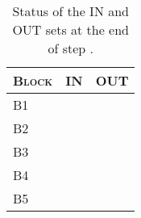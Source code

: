 \begin{table}[H]
\centering
\begin{tabular}{lcc}
	\toprule
	\textsc{Block}	& \textsc{IN}	& \textsc{OUT} \\
	\midrule
	B1	& \INBone	& \OUTBone	\\
	B2	& \INBtwo	& \OUTBtwo	\\
	B3	& \INBthree	& \OUTBthree\\
	B4	& \INBfour	& \OUTBfour	\\
	B5	& \INBfive	& \OUTBfive	\\
\end{tabular}
\label{tab:3-b-1}
\caption{Status of the IN and OUT sets at the end of step .}
\end{table}
